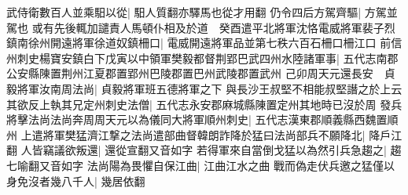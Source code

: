 武侍衛數百人並乘馹以從|{
	馹人質翻亦驛馬也從才用翻}
仍令四后方駕齊驅|{
	方駕並駕也}
或有先後輒加譴責人馬頓仆相及於道　癸酉遣平北將軍沈恪電威將軍裴子烈鎮南徐州開遠將軍徐道奴鎮柵口|{
	電威開遠將軍品並第七秩六百石柵口柵江口}
前信州刺史楊寶安鎮白下戊寅以中領軍樊毅都督荆郢巴武四州水陸諸軍事|{
	五代志南郡公安縣陳置荆州江夏郡置郢州巴陵郡置巴州武陵郡置武州}
己卯周天元還長安　貞毅將軍汝南周法尚|{
	貞毅將軍班五德將軍之下}
與長沙王叔堅不相能叔堅譖之於上云其欲反上執其兄定州刺史法僧|{
	五代志永安郡麻城縣陳置定州其地時已沒於周}
發兵將擊法尚法尚奔周周天元以為儀同大將軍順州刺史|{
	五代志漢東郡順義縣西魏置順州}
上遣將軍樊猛濟江撃之法尚遣部曲督韓朗詐降於猛曰法尚部兵不願降北|{
	降戶江翻}
人皆竊議欲叛還|{
	還從宣翻又音如字}
若得軍來自當倒戈猛以為然引兵急趨之|{
	趨七喻翻又音如字}
法尚陽為畏懼自保江曲|{
	江曲江水之曲}
戰而偽走伏兵邀之猛僅以身免沒者幾八千人|{
	幾居依翻}



